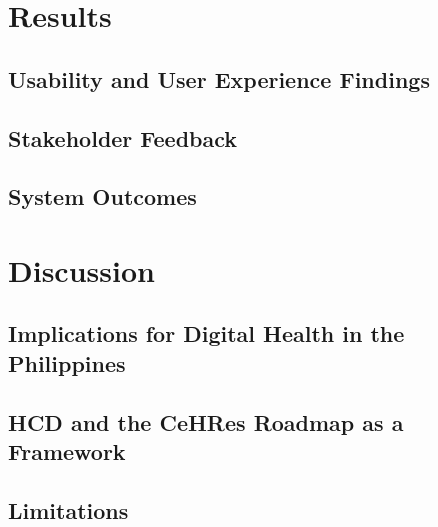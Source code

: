 \documentclass[manuscript, screen, review]{acmart}
\begin{document}
\section{Results}

\subsection{Usability and User Experience Findings}

\subsection{Stakeholder Feedback}

\subsection{System Outcomes}


\section{Discussion}

\subsection{Implications for Digital Health in the Philippines}

\subsection{HCD and the CeHRes Roadmap as a Framework}

\subsection{Limitations}
\end{document}
